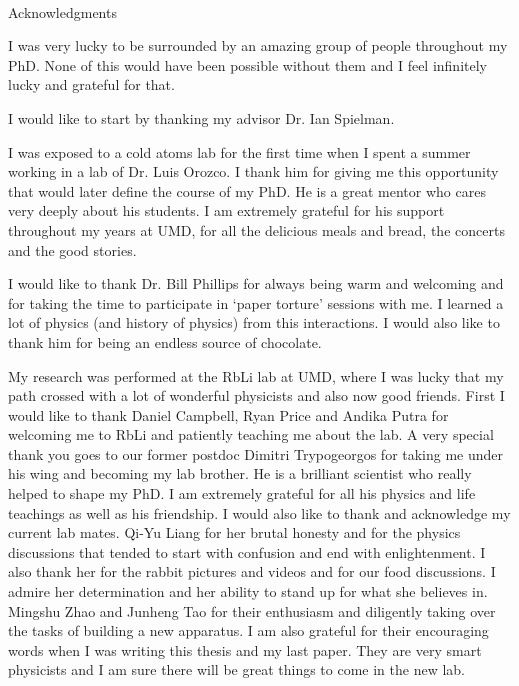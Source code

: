 
\renewcommand{\baselinestretch}{2}
\small\normalsize
\hbox{\ }
 
\vspace{-.65in}

\begin{center}
\large{Acknowledgments} 
\end{center} 

\vspace{1ex}

I was very lucky to be surrounded by an amazing group of people throughout my PhD. None of this would have been possible without them and I feel infinitely lucky and grateful for that. 

I would like to start by thanking my advisor Dr. Ian Spielman. 

I was exposed to a cold atoms lab for the first time when I spent a summer working in a lab of Dr. Luis Orozco. I thank him for giving me this opportunity that would later define the course of my PhD. He is a great mentor who cares very deeply about his students. I am extremely grateful for his support throughout my years at UMD, for all the delicious meals and bread, the concerts and the good stories. 

I would like to thank Dr. Bill Phillips for always being  warm and welcoming and for taking the time to participate in `paper torture' sessions with me. I learned a lot of physics (and history of physics) from this interactions. I would also like to thank him for being an endless source of chocolate. 

My research was performed at the RbLi lab at UMD, where I was lucky  that my path crossed with a lot of wonderful physicists and also now good friends. First I would like to thank  Daniel Campbell, Ryan Price and Andika Putra for welcoming me to RbLi and patiently teaching me about the lab. A very special thank you goes to our former postdoc Dimitri Trypogeorgos for taking me under his wing and becoming my lab brother. He is a brilliant scientist who really helped to shape my PhD. I am extremely grateful for all his physics and life teachings as well as his friendship. I would also like to thank and acknowledge my current lab mates. Qi-Yu Liang for her brutal honesty and for the physics discussions that tended to start with confusion and end with enlightenment. I also thank her for the rabbit pictures and videos and for our food discussions. I admire her determination and her ability to stand up for what she believes in. Mingshu Zhao and Junheng Tao for their enthusiasm and diligently taking over the tasks of building a new apparatus. I am also grateful for their encouraging words when I was writing this thesis and my last paper. They are very smart physicists and I am sure there will be great things to come in the new lab. 

